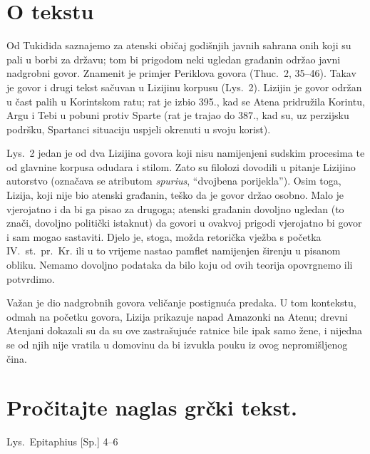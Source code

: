 

\section*{O tekstu}

Od Tukidida saznajemo za atenski običaj godišnjih javnih sahrana onih koji su pali u borbi za državu; tom bi prigodom neki ugledan građanin održao javni nadgrobni govor. Znamenit je primjer Periklova govora (Thuc.~2, 35–46). Takav je govor i drugi tekst sačuvan u Lizijinu korpusu (Lys.~2). Lizijin je govor održan u čast palih u Korintskom ratu; rat je izbio 395., kad se Atena pridružila Korintu, Argu i Tebi u pobuni protiv Sparte (rat je trajao do 387., kad su, uz perzijsku podršku, Spartanci situaciju uspjeli okrenuti u svoju korist).

Lys.~2 jedan je od dva Lizijina govora koji nisu namijenjeni sudskim procesima te od glavnine korpusa odudara i stilom. Zato su filolozi dovodili u pitanje Lizijino autorstvo (označava se atributom \textit{spurius}, ``dvojbena porijekla''). Osim toga, Lizija, koji nije bio atenski građanin, teško da je govor držao osobno. Malo je vjerojatno i da bi ga pisao za drugoga; atenski građanin dovoljno ugledan (to znači, dovoljno politički istaknut) da govori u ovakvoj prigodi vjerojatno bi govor i sam mogao sastaviti. Djelo je, stoga, možda retorička vježba s početka IV.~st.\ pr.~Kr. ili u to vrijeme nastao pamflet namijenjen širenju u pisanom obliku. Nemamo dovoljno podataka da bilo koju od ovih teorija opovrgnemo ili potvrdimo.

Važan je dio nadgrobnih govora veličanje postignuća predaka. U tom kontekstu, odmah na početku govora, Lizija prikazuje napad Amazonki na Atenu; drevni Atenjani dokazali su da su ove zastrašujuće ratnice bile ipak samo žene, i nijedna se od njih nije vratila u domovinu da bi izvukla pouku iz ovog nepromišljenog čina.


\newpage

\section*{Pročitajte naglas grčki tekst.}

Lys.\ Epitaphius [Sp.] 4–6


